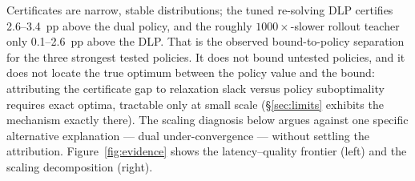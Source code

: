 \documentclass[11pt]{article}
\begin{document}
Certificates are narrow, stable distributions; the tuned re-solving
DLP certifies 2.6--3.4~pp above the dual policy, and the
roughly $1000\times$-slower rollout teacher only 0.1--2.6~pp above
the DLP.
That is the observed bound-to-policy separation for the three
strongest tested policies. It does not bound untested policies, and it does not
locate the true optimum between the policy value and the bound:
attributing the certificate gap to relaxation slack versus policy
suboptimality requires exact optima, tractable only at
small scale (\S\ref{sec:limits} exhibits the mechanism exactly there).
The scaling diagnosis below argues against one specific alternative
explanation --- dual under-convergence --- without settling the
attribution.
Figure~\ref{fig:evidence} shows the latency--quality frontier (left)
and the scaling decomposition (right).
\end{document}
